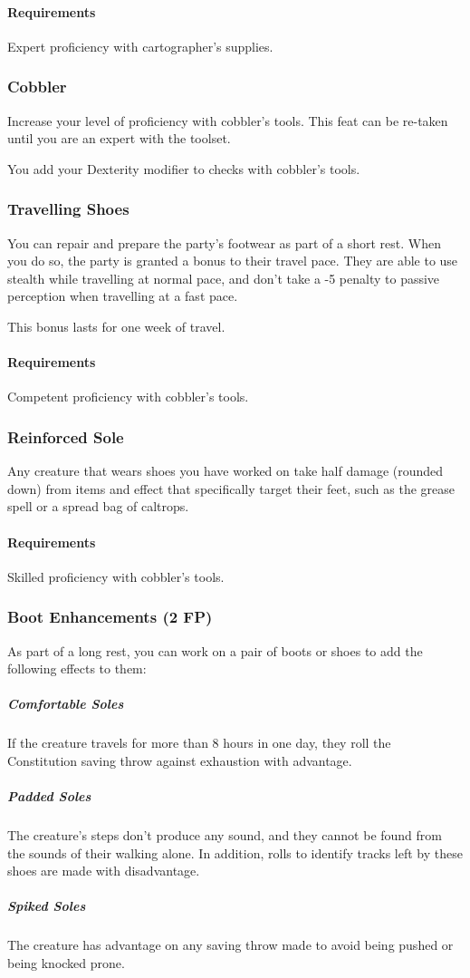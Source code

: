     \paragraph{Requirements} Expert proficiency with cartographer's supplies.

\subsubsection{Cobbler} \label{feat::cobbler}
    Increase your level of proficiency with cobbler's tools.
    This feat can be re-taken until you are an expert with the toolset.

    You add your Dexterity modifier to checks with cobbler's tools.
\subsubsection{Travelling Shoes} \label{feat::travellingshoes}
    You can repair and prepare the party's footwear as part of a short rest.
    When you do so, the party is granted a bonus to their travel pace.
    They are able to use stealth while travelling at normal pace, and don't take a -5 penalty to passive perception when travelling at a fast pace.

    This bonus lasts for one week of travel.
    \paragraph{Requirements} Competent proficiency with cobbler's tools.
\subsubsection{Reinforced Sole} \label{feat::reinforcedsole}
    Any creature that wears shoes you have worked on take half damage (rounded down) from items and effect that specifically target their feet, such as the grease spell or a spread bag of caltrops.
    \paragraph{Requirements} Skilled proficiency with cobbler's tools.
\subsubsection{Boot Enhancements (2 FP)} \label{feat::bootenhancements}
    As part of a long rest, you can work on a pair of boots or shoes to add the following effects to them:
    \subparagraph{Comfortable Soles} If the creature travels for more than 8 hours in one day, they roll the Constitution saving throw against exhaustion with advantage.
    \subparagraph{Padded Soles} The creature's steps don't produce any sound, and they cannot be found from the sounds of their walking alone.
    In addition, rolls to identify tracks left by these shoes are made with disadvantage.
    \subparagraph{Spiked Soles} The creature has advantage on any saving throw made to avoid being pushed or being knocked prone.

